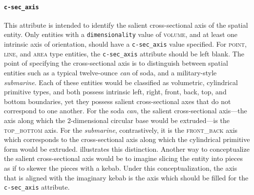 \documentclass[11pt]{article}
\begin{document}
\paragraph{\texttt{c-sec\_axis}} %
\label{par:c_sec_axis}
This attribute is intended to identify the salient cross-sectional axis of the spatial entity. Only entities with a \texttt{dimensionality} value of \textsc{volume}, and at least one intrinsic axis of orientation, should have a \texttt{c-sec\_axis} value specified. For \textsc{point}, \textsc{line}, and \textsc{area} type entities, the \texttt{c-sec\_axis} attribute should be left blank. The point of specifying the cross-sectional axis is to distinguish between spatial entities such as a typical twelve-ounce \emph{can} of soda, and a military-style \emph{submarine}. Each of these entities would be classified as volumetric, cylindrical primitive types, and both possess intrinsic left, right, front, back, top, and bottom boundaries, yet they possess salient cross-sectional axes that do not correspond to one another. For the soda \emph{can}, the salient cross-sectional axis---the axis along which the 2-dimensional circular base would be extruded---is the \textsc{top\_bottom} axis. For the \emph{submarine}, contrastively, it is the \textsc{front\_back} axis which corresponds to the cross-sectional axis along which the cylindrical primitive form would be extruded.  illustrates this distinction. Another way to conceptualize the salient cross-sectional axis would be to imagine slicing the entity into pieces as if to skewer the pieces with a kebab. Under this conceptualization, the axis that is aligned with the imaginary kebab is the axis which should be filled for the \texttt{c-sec\_axis} attribute.
\end{document}
